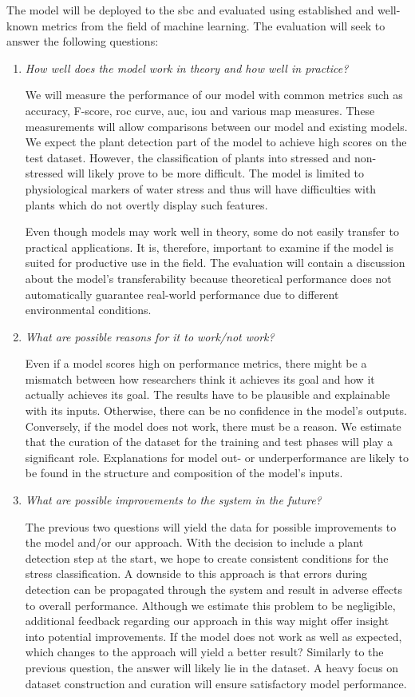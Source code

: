 \documentclass[draft,final]{vutinfth} %
\begin{document}
The model will be deployed to the \gls{sbc} and evaluated using
established and well-known metrics from the field of machine
learning. The evaluation will seek to answer the following questions:

\begin{enumerate}
\item \emph{How well does the model work in theory and how well in
    practice?}

  We will measure the performance of our model with common metrics
  such as accuracy, F-score, \gls{roc} curve, \gls{auc}, \gls{iou} and
  various \gls{map} measures. These measurements will allow
  comparisons between our model and existing models. We expect the
  plant detection part of the model to achieve high scores on the test
  dataset. However, the classification of plants into stressed and
  non-stressed will likely prove to be more difficult. The model is
  limited to physiological markers of water stress and thus will have
  difficulties with plants which do not overtly display such features.

  Even though models may work well in theory, some do not easily
  transfer to practical applications. It is, therefore, important to
  examine if the model is suited for productive use in the field. The
  evaluation will contain a discussion about the model's
  transferability because theoretical performance does not
  automatically guarantee real-world performance due to different
  environmental conditions.
\item \emph{What are possible reasons for it to work/not work?}

  Even if a model scores high on performance metrics, there might be a
  mismatch between how researchers think it achieves its goal and how
  it actually achieves its goal. The results have to be plausible and
  explainable with its inputs. Otherwise, there can be no confidence
  in the model's outputs. Conversely, if the model does not work,
  there must be a reason. We estimate that the curation of the dataset
  for the training and test phases will play a significant
  role. Explanations for model out- or underperformance are likely to
  be found in the structure and composition of the model's inputs.
\item \emph{What are possible improvements to the system in the
    future?}

  The previous two questions will yield the data for possible
  improvements to the model and/or our approach. With the decision to
  include a plant detection step at the start, we hope to create
  consistent conditions for the stress classification. A downside to
  this approach is that errors during detection can be propagated
  through the system and result in adverse effects to overall
  performance. Although we estimate this problem to be negligible,
  additional feedback regarding our approach in this way might offer
  insight into potential improvements. If the model does not work as
  well as expected, which changes to the approach will yield a better
  result? Similarly to the previous question, the answer will likely
  lie in the dataset. A heavy focus on dataset construction and
  curation will ensure satisfactory model performance.
\end{enumerate}
\end{document}
